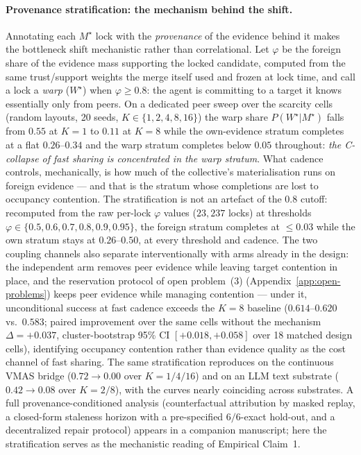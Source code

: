 \documentclass{article}
\begin{document}
\paragraph{Provenance stratification: the mechanism behind the shift.}
Annotating each $M^\star$ lock with the \emph{provenance} of the
evidence behind it makes the bottleneck shift mechanistic rather than
correlational. Let $\varphi$ be the foreign share of the evidence mass
supporting the locked candidate, computed from the same trust/support
weights the merge itself used and frozen at lock time, and call a lock
a \emph{warp} ($W^\star$) when $\varphi \ge 0.8$: the agent is
committing to a target it knows essentially only from peers. On a
dedicated peer sweep over the scarcity cells (random layouts, 20
seeds, $K\in\{1,2,4,8,16\}$) the warp share $P(W^\star|M^\star)$
falls from $0.55$ at $K{=}1$ to $0.11$ at $K{=}8$ while the
own-evidence stratum completes at a flat $0.26$--$0.34$ and the warp
stratum completes below $0.05$ throughout: \emph{the C-collapse of
fast sharing is concentrated in the warp stratum}. What cadence
controls, mechanically, is how much of the collective's
materialisation runs on foreign evidence --- and that is
the stratum whose completions are lost to occupancy contention. The stratification is not
an artefact of the $0.8$ cutoff: recomputed from the raw per-lock
$\varphi$ values ($23{,}237$ locks) at thresholds
$\varphi{\in}\{0.5,0.6,0.7,0.8,0.9,0.95\}$, the foreign stratum
completes at ${\le}0.03$ while the own stratum stays at
$0.26$--$0.50$, at every threshold and cadence. The two coupling
channels also separate interventionally with arms already in the
design: the independent arm removes peer evidence while leaving
target contention in place, and the reservation protocol of open
problem~(3) (Appendix~\ref{app:open-problems}) keeps peer evidence
while managing contention --- under it, unconditional success at fast
cadence exceeds the $K{=}8$ baseline ($0.614$--$0.620$ vs.\
$0.583$; paired improvement over the same cells without the mechanism
$\Delta=+0.037$, cluster-bootstrap 95\% CI $[+0.018,+0.058]$ over 18
matched design cells), identifying occupancy contention rather than
evidence quality as the cost channel of fast sharing. The same stratification
reproduces on the continuous VMAS bridge ($0.72\to0.00$ over
$K{=}1/4/16$) and on an LLM text substrate ($0.42\to0.08$ over
$K{=}2/8$), with the curves nearly coinciding across substrates. A
full provenance-conditioned analysis (counterfactual attribution by
masked replay, a closed-form staleness horizon with a pre-specified
$6/6$-exact hold-out, and a decentralized repair protocol) appears in
a companion manuscript; here the stratification serves as the
mechanistic reading of Empirical Claim~1.
\end{document}

